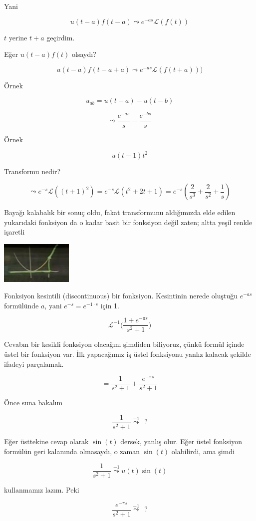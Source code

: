 \documentclass[12pt,fleqn]{article}\usepackage{../../common}
\begin{document}
Yani

$$ u(t-a)f(t-a) \leadsto e^{-as}\mathcal{L}(f(t)) $$

$t$ yerine $t+a$ geçirdim.

Eğer $u(t-a)f(t)$ olsaydı?

$$ u(t-a)f(t-a+a) \leadsto e^{-as}\mathcal{L}(f(t+a))) $$

Örnek 

$$ u_{ab} = u(t-a) - u(t-b) $$

$$ \leadsto \frac{e^{-as}}{s} - \frac{e^{-bs}}{s} $$

Örnek

$$ u(t-1)t^2 $$

Transformu nedir? 

$$ \leadsto e^{-s}\mathcal{L}((t+1)^2) = 
e^{-s}\mathcal{L} (t^2+2t+1) =
e^{-s}(\frac{2}{s^3} + \frac{2}{s^2} + \frac{1}{s})
 $$

Bayağı kalabalık bir sonuç oldu, fakat transformunu aldığımızda elde edilen
yukarıdaki fonksiyon da o kadar basit bir fonksiyon değil zaten; altta
yeşil renkle işaretli 

\includegraphics[height=2cm]{22_9.png}

Fonksiyon kesintili (discontinuous) bir fonksiyon. Kesintinin nerede
oluştuğu $e^{-as}$ formülünde $a$, yani $e^{-s} = e^{-1\cdot s}$ için 1. 

$$ \mathcal{L}^{-1}\bigg( \frac{1+e^{-\pi s}}{s^2+1} \bigg) $$

Cevabın bir kesikli fonksiyon olacağını şimdiden biliyoruz, çünkü formül
içinde üstel bir fonksiyon var. İlk yapacağımız iş üstel fonksiyonu yanlız
kalacak şekilde ifadeyi parçalamak. 

$$ = \frac{1}{s^2+1} + \frac{e^{-\pi s}}{s^2 + 1}$$

Önce suna bakalım

$$ \frac{1}{s^2+1} \stackrel{-1}{\leadsto}  \ \ ? $$

Eğer üsttekine cevap olarak $\sin(t)$ dersek, yanlış olur. Eğer üstel
fonksiyon formülün geri kalanında olmasaydı, o zaman $\sin(t)$ olabilirdi,
ama şimdi 

$$ \frac{1}{s^2+1} \stackrel{-1}{\leadsto} u(t)\sin(t) $$

kullanmamız lazım. Peki

$$ \frac{e^{-\pi s}}{s^2 + 1} \stackrel{-1}{\leadsto} \ \ ? $$
\end{document}
